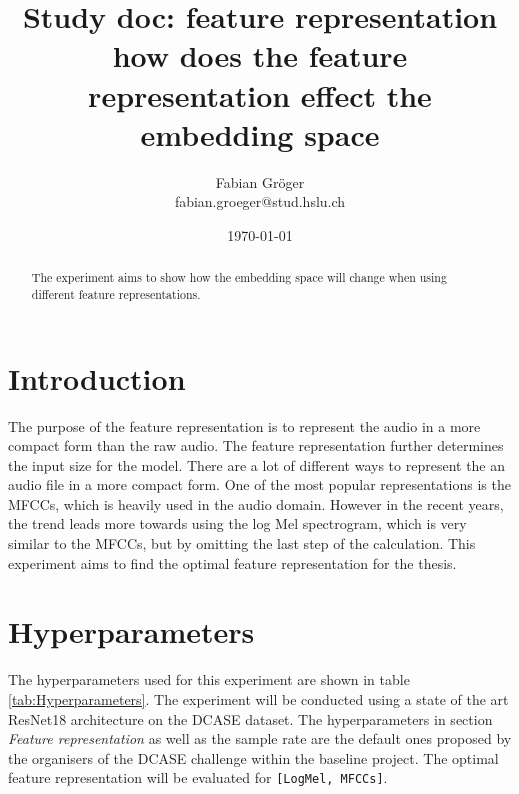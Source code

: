 \documentclass[twocolumn]{article}
\title{\huge{\textbf{Study doc: feature representation}}\\ \normalsize \Large{how does the feature representation  effect the embedding space}}
\author{Fabian Gröger\\fabian.groeger@stud.hslu.ch}
\date{\today}
\begin{document}
\maketitle

\begin{abstract}
The experiment aims to show how the embedding space will change when using different feature representations.
\end{abstract}

\section{Introduction}
The purpose of the feature representation is to represent the audio in a more compact form than the raw audio. The feature representation further determines the input size for the model. There are a lot of different ways to represent the an audio file in a more compact form. One of the most popular representations is the MFCCs, which is heavily used in the audio domain. However in the recent years, the trend leads more towards using the log Mel spectrogram, which is very similar to the MFCCs, but by omitting the last step of the calculation. This experiment aims to find the optimal feature representation for the thesis.

\section{Hyperparameters}
The hyperparameters used for this experiment are shown in table \ref{tab:Hyperparameters}. The experiment will be conducted using a state of the art ResNet18 architecture on the DCASE dataset. The hyperparameters in section \textit{Feature representation} as well as the sample rate are the default ones proposed by the organisers of the DCASE challenge within the baseline project.
The optimal feature representation will be evaluated for \texttt{[LogMel, MFCCs]}.
\end{document}
